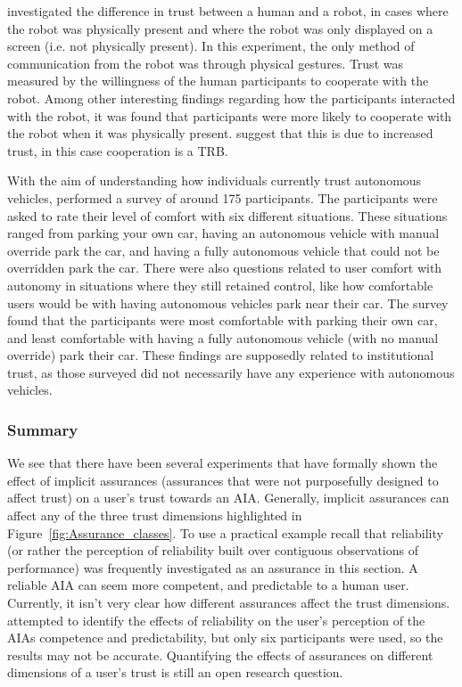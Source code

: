 \citet{Bainbridge2011-pl} investigated the difference in trust between a human and a robot, in cases where the robot was physically present and where the robot was only displayed on a screen (i.e. not physically present). In this experiment, the only method of communication from the robot was through physical gestures. Trust was measured by the willingness of the human participants to cooperate with the robot. Among other interesting findings regarding how the participants interacted with the robot, it was found that participants were more likely to cooperate with the robot when it was physically present. \citeauthor{Bainbridge2011-pl} suggest that this is due to increased trust, in this case cooperation is a TRB.

With the aim of understanding how individuals currently trust autonomous vehicles, \citet{Munjal_Desai2009-en} performed a survey of around 175 participants. The participants were asked to rate their level of comfort with six different situations. These situations ranged from parking your own car, having an autonomous vehicle with manual override park the car, and having a fully autonomous vehicle that could not be overridden park the car. There were also questions related to user comfort with autonomy in situations where they still retained control, like how comfortable users would be with having autonomous vehicles park near their car. The survey found that the participants were most comfortable with parking their own car, and least comfortable with having a fully autonomous vehicle (with no manual override) park their car. These findings are supposedly related to institutional trust, as those surveyed did not necessarily have any experience with autonomous vehicles.

\subsubsection{Summary}
We see that there have been several experiments that have formally shown the effect of implicit assurances (assurances that were not purposefully designed to affect trust) on a user's trust towards an AIA. Generally, implicit assurances can affect any of the three trust dimensions highlighted in Figure~\ref{fig:Assurance_classes}. To use a practical example recall that reliability (or rather the perception of reliability built over contiguous observations of performance) was frequently investigated as an assurance in this section. A reliable AIA can seem more competent, and predictable to a human user. Currently, it isn't very clear how different assurances affect the trust dimensions.  attempted to identify the effects of reliability on the user's perception of the AIAs competence and predictability, but only six participants were used, so the results may not be accurate. Quantifying the effects of assurances on different dimensions of a user's trust is still an open research question.

